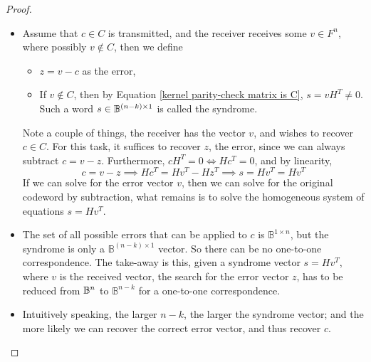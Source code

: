 \documentclass[../../main.tex]{subfiles}
\begin{document}
\begin{proof}
\begin{itemize}
    If $H$ is a $(n-k)\times n$ matrix, with rank (dimension of column-span) of $(n-k)$, this forces the row-space of $H^T$ to have dimension $(n-k)$, since 
    \[
    C = \image{T} = \{T(x),\,x\in \mathbb{B}^k\}
    \]
    We usually say that $H$ is a $(n-k)\times n$ matrix, with rank (column-span) $n-k$. And this forces the row-space of $H^T$ to have dimension $(n-k)$. \\
    
    The following equation is of utmost importance, if the rank of $H$ is $n-k$, then
    \begin{equation}\label{kernel parity-check matrix is C}
    \boxed{C = \{w\in \mathbb{B}^n,\, wH^T = 0\}}
    \end{equation}
    Every valid codeword $c\in C\subseteq \bb{B}^n$ must satisfy this property. \\
    
    The proof is quite straight-forward, we have already shown that $C\subseteq\{w\in \bb{B}^n,\, wH^T=0\}$, the second part of the proof just consists of showing that $\dim{\ker{H^T}} = (n-k)$. The reader should consult Chapter 8.8 of Nicholson's Linear Algebra for more details.
    \item Assume that $c\in C$ is transmitted, and the receiver receives some $v\in F^n$, where possibly $v\notin C$, then we define
    \begin{itemize}
        \item $z=v-c$ as the error,
        \item If $v\notin C$, then by Equation \eqref{kernel parity-check matrix is C}, $s=vH^T\neq 0$. Such a word $s\in\mathbb{B}^{(n-k)\times 1}$ is called the syndrome.
    \end{itemize} 
    Note a couple of things, the receiver has the vector $v$, and wishes to recover $c\in C$. For this task, it suffices to recover $z$, the error, since we can always subtract $c = v-z$. Furthermore, $cH^T = 0 \iff Hc^T = 0$, and by linearity, 
    \[
    c = v-z\implies Hc^T = Hv^T - Hz^T\implies s=Hv^T=Hv^T
    \]
    If we can solve for the error vector $v$, then we can solve for the original codeword by subtraction, what remains is to solve the homogeneous system of equations $s = Hv^T$.\\
    
    \item The set of all possible errors that can be applied to $c$ is $\mathbb{B}^{1\times n}$, but the syndrome is only a $\mathbb{B}^{(n-k)\times 1}$ vector. So there can be no one-to-one correspondence. The take-away is this, given a syndrome vector $s = Hv^T$, where $v$ is the received vector, the search for the error vector $z$, has to be reduced from $\mathbb{B}^{n}$ to $\mathbb{B}^{n-k}$ for a one-to-one correspondence.
    \item Intuitively speaking, the larger $n-k$, the larger the syndrome vector; and the more likely we can recover the correct error vector, and thus recover $c$.
\end{itemize}
\end{proof}
\end{document}
